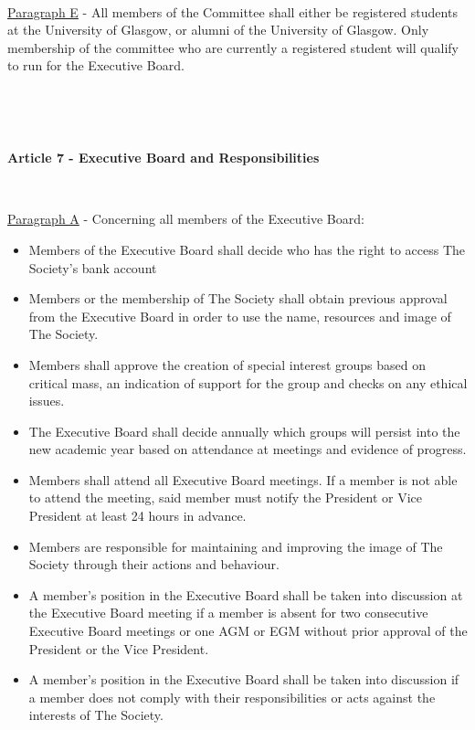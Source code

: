 ~

\underline{Paragraph E} - All members of the Committee shall either be
registered students at the University of Glasgow, or
alumni of the University of Glasgow. Only membership of the committee who 
are currently a registered student will qualify to run for the Executive
Board.

~

~

\large{\textbf{Article 7 - Executive Board and Responsibilities}}

~

\underline{Paragraph A} - Concerning all members of the Executive Board:

\begin{itemize}

    \item{Members of the Executive Board shall decide who has the right to access The Society’s bank account}

    \item{Members or the membership of The Society shall obtain previous approval from the Executive Board in order to use the name, resources and image of The Society.}

    \item{Members shall approve the creation of special interest groups based on critical mass, an indication of support for the group and checks on any ethical issues.}

    \item{The Executive Board shall decide annually which groups will persist into the new academic year based on attendance at meetings and evidence of progress.}

    \item{Members shall attend all Executive Board meetings. If a member is not able to attend the meeting, said member must notify the President or Vice President at least 24 hours in advance.}

    \item{Members are responsible for maintaining and improving the image of The Society through their actions and behaviour.}

    \item{A member's position in the Executive Board shall be taken into discussion at the Executive Board meeting if a member is absent for two consecutive Executive Board meetings or one AGM or EGM without prior approval of the President or the Vice President.}

    \item{A member's position in the Executive Board shall be taken into discussion if a member does not comply with their responsibilities or acts against the interests of The Society.}


\end{itemize}
